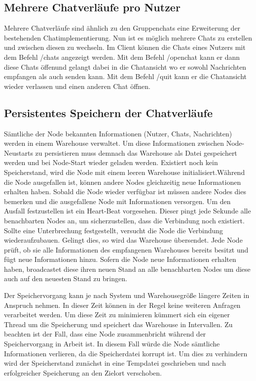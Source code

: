 \author{Matthias Vonend, Troy Keßler}
\subsection{Mehrere Chatverläufe pro Nutzer}
Mehrere Chatverläufe sind ähnlich zu den Gruppenchats eine Erweiterung der bestehenden Chatimplementierung. Nun ist es möglich mehrere Chats zu erstellen und zwischen diesen zu wechseln.
Im Client können die Chats eines Nutzers mit dem Befehl /chats angezeigt werden. 
Mit dem Befehl /openchat kann er dann diese Chats öffenund gelangt dabei in die Chatansicht wo er sowohl Nachrichten empfangen als auch senden kann.
Mit dem Befehl /quit kann er die Chatansicht wieder verlassen und einen anderen Chat öffnen.

\author{Matthias Vonend}
\subsection{Persistentes Speichern der Chatverläufe}\label{persistance}
Sämtliche der Node bekannten Informationen (Nutzer, Chats, Nachrichten) werden in einem Warehouse verwaltet. Um diese Informationen zwischen Node-Neustarts zu persistieren muss demnach das Warehouse als Datei gespeichert werden und bei Node-Start wieder geladen werden. Existiert noch kein Speicherstand, wird die Node mit einem leeren Warehouse initialisiert.Während die Node ausgefallen ist, können andere Nodes gleichzeitig neue Informationen erhalten haben. Sobald die Node wieder verfügbar ist müssen andere Nodes dies bemerken und die ausgefallene Node mit Informationen versorgen. Um den Ausfall festzustellen ist ein Heart-Beat vorgesehen. Dieser pingt jede Sekunde alle benachbarten Nodes an, um sicherzustellen, dass die Verbindung noch existiert. Sollte eine Unterbrechung festgestellt, versucht die Node die Verbindung wiederaufzubauen. Gelingt dies, so wird das Warehouse übersendet. Jede Node prüft, ob sie alle Informationen des empfangenen Warehouses bereits besitzt und fügt neue Informationen hinzu. Sofern die Node neue Informationen erhalten haben, broadcastet diese ihren neuen Stand an alle benachbarten Nodes um diese auch auf den neuesten Stand zu bringen.

Der Speichervorgang kann je nach System und Warehousegröße längere Zeiten in Anspruch nehmen. In dieser Zeit können in der Regel keine weiteren Anfragen verarbeitet werden. Um diese Zeit zu minimieren kümmert sich ein eigener Thread um die Speicherung und speichert das Warehouse in Intervallen.
Zu beachten ist der Fall, dass eine Node zusammenbricht während der Speichervorgang in Arbeit ist. In diesem Fall würde die Node sämtliche Informationen verlieren, da die Speicherdatei korrupt ist. Um dies zu verhindern wird der Speicherstand zunächst in eine Tempdatei geschrieben und nach erfolgreicher Speicherung an den Zielort verschoben.

